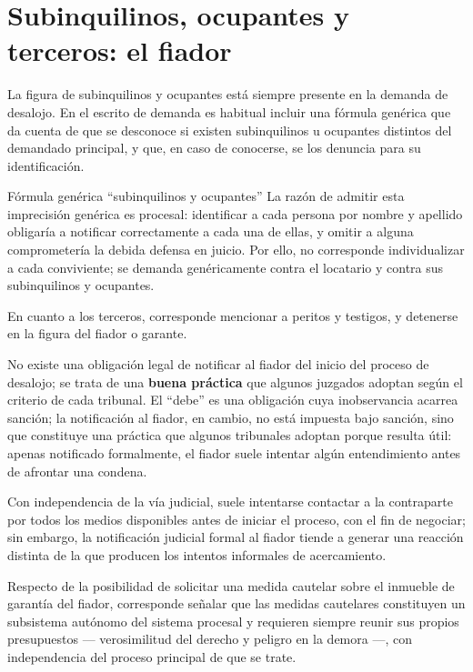 \documentclass[12pt,oneside]{book}
\begin{document}
\section{Subinquilinos, ocupantes y terceros: el fiador}

La figura de subinquilinos y ocupantes está siempre presente en la demanda de desalojo. En el escrito de demanda es habitual incluir una fórmula genérica que da cuenta de que se desconoce si existen subinquilinos u ocupantes distintos del demandado principal, y que, en caso de conocerse, se los denuncia para su identificación.

\begin{definition}{Fórmula genérica ``subinquilinos y ocupantes''}
La razón de admitir esta imprecisión genérica es procesal: identificar a cada persona por nombre y apellido obligaría a notificar correctamente a cada una de ellas, y omitir a alguna comprometería la debida defensa en juicio. Por ello, no corresponde individualizar a cada conviviente; se demanda genéricamente contra el locatario y contra sus subinquilinos y ocupantes.
\end{definition}

En cuanto a los terceros, corresponde mencionar a peritos y testigos, y detenerse en la figura del fiador o garante.

\begin{important}
No existe una obligación legal de notificar al fiador del inicio del proceso de desalojo; se trata de una \textbf{buena práctica} que algunos juzgados adoptan según el criterio de cada tribunal. El ``debe'' es una obligación cuya inobservancia acarrea sanción; la notificación al fiador, en cambio, no está impuesta bajo sanción, sino que constituye una práctica que algunos tribunales adoptan porque resulta útil: apenas notificado formalmente, el fiador suele intentar algún entendimiento antes de afrontar una condena.
\end{important}

Con independencia de la vía judicial, suele intentarse contactar a la contraparte por todos los medios disponibles antes de iniciar el proceso, con el fin de negociar; sin embargo, la notificación judicial formal al fiador tiende a generar una reacción distinta de la que producen los intentos informales de acercamiento.

Respecto de la posibilidad de solicitar una medida cautelar sobre el inmueble de garantía del fiador, corresponde señalar que las medidas cautelares constituyen un subsistema autónomo del sistema procesal y requieren siempre reunir sus propios presupuestos --- verosimilitud del derecho y peligro en la demora ---, con independencia del proceso principal de que se trate.
\end{document}
